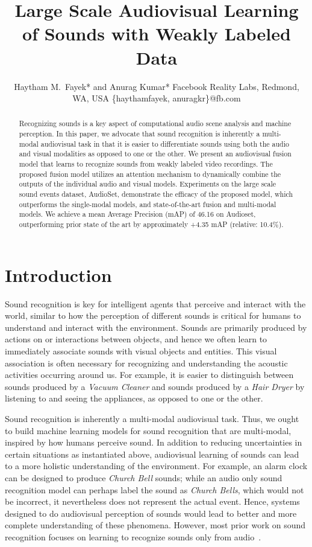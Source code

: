 \documentclass{article}
\title{Large Scale Audiovisual Learning of Sounds with Weakly Labeled Data}
\author{
    Haytham M.\ Fayek* and Anurag Kumar*\blfootnote{Equal contribution.}
    \affiliations
    Facebook Reality Labs, Redmond, WA, USA
    \emails
    \{haythamfayek, anuragkr\}@fb.com
}
\begin{document}
\maketitle

\begin{abstract}
	Recognizing sounds is a key aspect of computational audio scene analysis and machine perception.
	In this paper, we advocate that sound recognition is inherently a multi-modal audiovisual task in that it is easier to differentiate sounds using both the audio and visual modalities as opposed to one or the other.
	We present an audiovisual fusion model that learns to recognize sounds from weakly labeled video recordings.
	The proposed fusion model utilizes an attention mechanism to dynamically combine the outputs of the individual audio and visual models.
	Experiments on the large scale sound events dataset, AudioSet, demonstrate the efficacy of the proposed model, which outperforms the single-modal models, and state-of-the-art fusion and multi-modal models.
	We achieve a mean Average Precision (mAP) of 46.16 on Audioset, outperforming prior state of the art by approximately +4.35 mAP (relative: 10.4\%).
\end{abstract}

\section{Introduction}\label{sec:introduction}

Sound recognition is key for intelligent agents that perceive and interact with the world, similar to how the perception of different sounds is critical for humans to understand and interact with the environment.
Sounds are primarily produced by actions on or interactions between objects, and hence we often learn to immediately associate sounds with visual objects and entities.
This visual association is often necessary for recognizing and understanding the acoustic activities occurring around us.
For example, it is easier to distinguish between sounds produced by a \emph{Vacuum Cleaner} and sounds produced by a \emph{Hair Dryer} by listening to and seeing the appliances, as opposed to one or the other.

Sound recognition is inherently a multi-modal audiovisual task.
Thus, we ought to build machine learning models for sound recognition that are multi-modal, inspired by how humans perceive sound.
In addition to reducing uncertainties in certain situations as instantiated above, audiovisual learning of sounds can lead to a more holistic understanding of the environment.
For example, an alarm clock can be designed to produce \emph{Church Bell} sounds; while an audio only sound recognition model can perhaps label the sound as \emph{Church Bells}, which would not be incorrect, it nevertheless does not represent the actual event. Hence, systems designed to do audiovisual perception of sounds would lead to better and more complete understanding of these phenomena. 
However, most prior work on sound recognition focuses on learning to recognize sounds only from audio~\cite{virtanen2018computational,kumar2018acoustic}.
\end{document}
